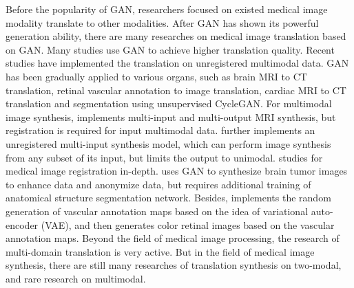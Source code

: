 \documentclass{ecai}
\begin{document}
Before the popularity of GAN, researchers focused on existed medical image modality translate to other modalities\cite{22burgos2015robust,33huang2017simultaneous,34vemulapalli2015unsupervised,36vannguyen2015crossdomain}. After GAN has shown its powerful generation ability, there are many researches on medical image translation based on GAN\cite{2zhang2018translating,20nie2017medical,35osokin2017gans,36vannguyen2015crossdomain,40kamnitsas2017unsupervised}. Many studies use GAN to achieve higher translation quality\cite{1zhao2018modular,5liang2018generative,6zhu2017unpaired,13choi2018stargan:}. Recent studies have implemented the translation on unregistered multimodal data\cite{2zhang2018translating,85joyce2017robust}.
GAN has been gradually applied to various organs, such as brain MRI to CT translation\cite{20nie2017medical,40kamnitsas2017unsupervised}, retinal vascular annotation to image translation\cite{41costa2017towards}, cardiac MRI to CT translation and segmentation using unsupervised CycleGAN\cite{6zhu2017unpaired,20nie2017medical}.
For multimodal image synthesis, \cite{84chartsias2018multimodal} implements multi-input and multi-output MRI synthesis, but registration is required for input multimodal data. \cite{85joyce2017robust} further implements an unregistered multi-input synthesis model, which can perform image synthesis from any subset of its input, but limits the output to unimodal. \cite{66Miao2018dilated} studies for medical image registration in-depth. \cite{4shin2018medical} uses GAN to synthesize brain tumor images to enhance data and anonymize data, but requires additional training of anatomical structure segmentation network.
Besides,\cite{41costa2017towards} implements the random generation of vascular annotation maps based on the idea of variational auto-encoder (VAE)\cite{87kingma2014auto-encoding}, and then generates color retinal images based on the vascular annotation maps.
Beyond the field of medical image processing, the research of multi-domain translation is very active\cite{1zhao2018modular,5liang2018generative,13choi2018stargan:,27isola2017image-to-image}.
But in the field of medical image synthesis, there are still many researches of translation synthesis on two-modal\cite{2zhang2018translating,20nie2017medical,22burgos2015robust,34vemulapalli2015unsupervised,35osokin2017gans,36vannguyen2015crossdomain,40kamnitsas2017unsupervised}, and rare research on multimodal\cite{84chartsias2018multimodal,85joyce2017robust,4shin2018medical}.
\end{document}
